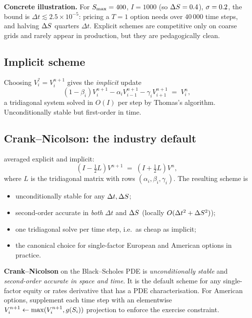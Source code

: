 \textbf{Concrete illustration.}  For $S_{\max} = 400$, $I = 1000$
(so $\Delta S = 0.4$), $\sigma=0.2$, the bound is $\Delta t \lesssim
2.5\times 10^{-5}$: pricing a $T=1$ option needs over $40\,000$ time
steps, and halving $\Delta S$ quarters $\Delta t$.  Explicit schemes
are competitive only on coarse grids and rarely appear in production,
but they are pedagogically clean.

\subsection{Implicit scheme}

Choosing $V_i^{?} = V_i^{n+1}$ gives the \emph{implicit} update
\begin{equation}
  (1 - \beta_i) V_i^{n+1} - \alpha_i V_{i-1}^{n+1} - \gamma_i V_{i+1}^{n+1}
  \;=\; V_i^n,
\end{equation}
a tridiagonal system solved in $O(I)$ per step by Thomas's algorithm.
Unconditionally stable but first-order in time.

\subsection{Crank--Nicolson: the industry default}

\citet{cranknicolson1947} averaged explicit and implicit:
\begin{equation}
  (I - \tfrac12 L) V^{n+1}
  \;=\; (I + \tfrac12 L) V^n,
\end{equation}
where $L$ is the tridiagonal matrix with rows $(\alpha_i, \beta_i,
\gamma_i)$.  The resulting scheme is
\begin{itemize}
  \item unconditionally stable for any $\Delta t, \Delta S$;
  \item second-order accurate in \emph{both} $\Delta t$ and $\Delta
    S$ (locally $O(\Delta t^2 + \Delta S^2)$);
  \item one tridiagonal solve per time step, i.e.\ as cheap as
    implicit;
  \item the canonical choice for single-factor European and American
    options in practice.
\end{itemize}

\begin{keyfactbox}
\textbf{Crank--Nicolson} on the Black--Scholes PDE is
\emph{unconditionally stable} and \emph{second-order accurate in
space and time}.  It is the default scheme for any single-factor
equity or rates derivative that has a PDE characterisation.  For
American options, supplement each time step with an elementwise
$V_i^{n+1} \leftarrow \max(V_i^{n+1}, g(S_i))$ projection to
enforce the exercise constraint.
\end{keyfactbox}

